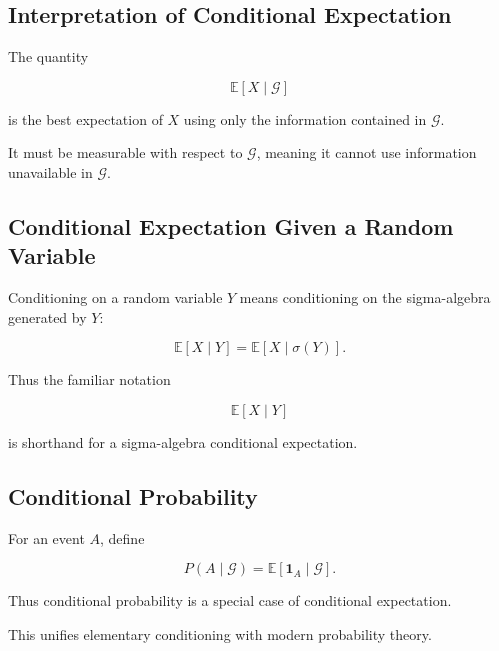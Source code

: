 \subsection{Interpretation of Conditional Expectation}
\label{subsec:conditional-expectation-information}

The quantity

\[
\mathbb{E}[X\mid\mathcal{G}]
\]

is the best expectation of \(X\) using only the information contained in
\(\mathcal{G}\).

It must be measurable with respect to \(\mathcal{G}\), meaning it cannot
use information unavailable in \(\mathcal{G}\).

\subsection{Conditional Expectation Given a Random Variable}
\label{subsec:conditional-expectation-given-rv}

Conditioning on a random variable \(Y\) means conditioning on the
sigma-algebra generated by \(Y\):

\[
\boxed{
\mathbb{E}[X\mid Y]
=
\mathbb{E}[X\mid\sigma(Y)].
}
\]

Thus the familiar notation

\[
\mathbb{E}[X\mid Y]
\]

is shorthand for a sigma-algebra conditional expectation.

\subsection{Conditional Probability}
\label{subsec:conditional-probability-measure}

For an event \(A\), define

\[
\boxed{
P(A\mid\mathcal{G})
=
\mathbb{E}
[
\mathbf{1}_A
\mid
\mathcal{G}
].
}
\]

Thus conditional probability is a special case of conditional
expectation.

This unifies elementary conditioning with modern probability theory.


